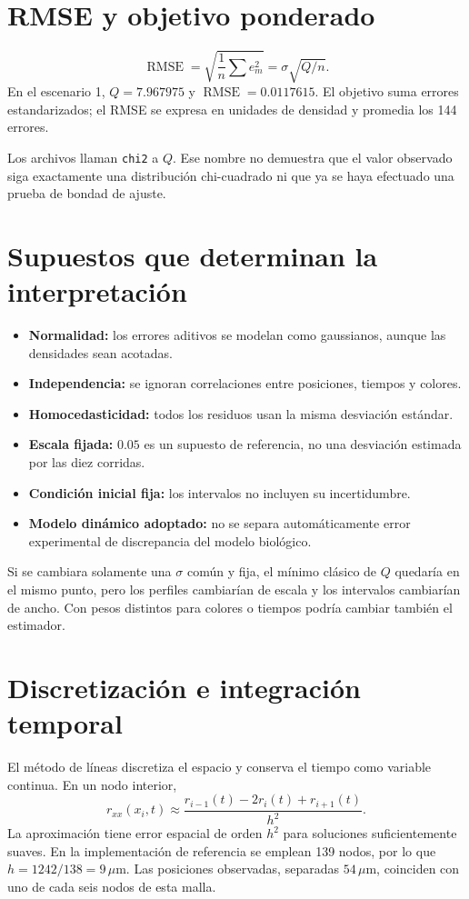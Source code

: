 \documentclass[11pt,a4paper]{report}
\newcommand{\RMSE}{\operatorname{RMSE}}
\begin{document}
\section{RMSE y objetivo ponderado}
\begin{equation}
\RMSE=\sqrt{\frac1n\sum e_m^2}=\sigma\sqrt{Q/n}.
\end{equation}
En el escenario 1, $Q=7.967975$ y $\RMSE=0.0117615$. El objetivo suma errores estandarizados; el RMSE se expresa en unidades de densidad y promedia los 144 errores.

Los archivos llaman \texttt{chi2} a $Q$. Ese nombre no demuestra que el valor observado siga exactamente una distribución chi-cuadrado ni que ya se haya efectuado una prueba de bondad de ajuste.

\section{Supuestos que determinan la interpretación}
\begin{itemize}
\item \textbf{Normalidad:} los errores aditivos se modelan como gaussianos, aunque las densidades sean acotadas.
\item \textbf{Independencia:} se ignoran correlaciones entre posiciones, tiempos y colores.
\item \textbf{Homocedasticidad:} todos los residuos usan la misma desviación estándar.
\item \textbf{Escala fijada:} $0.05$ es un supuesto de referencia, no una desviación estimada por las diez corridas.
\item \textbf{Condición inicial fija:} los intervalos no incluyen su incertidumbre.
\item \textbf{Modelo dinámico adoptado:} no se separa automáticamente error experimental de discrepancia del modelo biológico.
\end{itemize}
Si se cambiara solamente una $\sigma$ común y fija, el mínimo clásico de $Q$ quedaría en el mismo punto, pero los perfiles cambiarían de escala y los intervalos cambiarían de ancho. Con pesos distintos para colores o tiempos podría cambiar también el estimador.

\section{Discretización e integración temporal}
El método de líneas discretiza el espacio y conserva el tiempo como variable continua. En un nodo interior,
\[
r_{xx}(x_i,t)\approx\frac{r_{i-1}(t)-2r_i(t)+r_{i+1}(t)}{h^2}.
\]
La aproximación tiene error espacial de orden $h^2$ para soluciones suficientemente suaves. En la implementación de referencia se emplean 139 nodos, por lo que $h=1242/138=9\,\mu\mathrm m$. Las posiciones observadas, separadas $54\,\mu\mathrm m$, coinciden con uno de cada seis nodos de esta malla.
\end{document}
